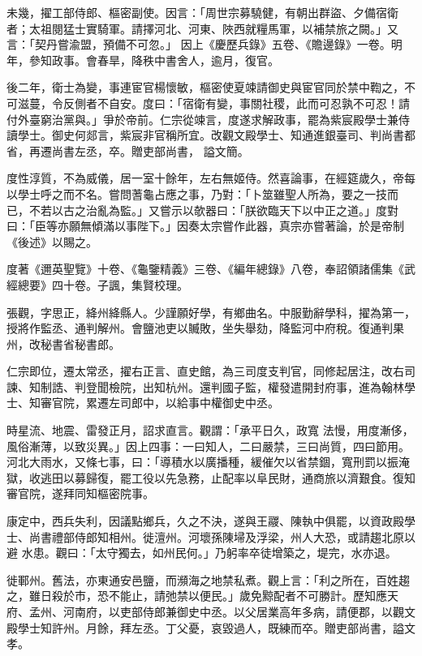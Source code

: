 \begin{pinyinscope}
 未幾，擢工部侍郎、樞密副使。因言：「周世宗募驍健，有朝出群盜、夕備宿衛者；太祖閱猛士實騎軍。請擇河北、河東、陜西就糧馬軍，以補禁旅之闕。」又言：「契丹嘗渝盟，預備不可忽。」
 因上《慶歷兵錄》五卷、《贍邊錄》一卷。明年，參知政事。會春旱，降秩中書舍人，逾月，復官。



 後二年，衛士為變，事連宦官楊懷敏，樞密使夏竦請御史與宦官同於禁中鞫之，不可滋蔓，令反側者不自安。度曰：「宿衛有變，事關社稷，此而可忍孰不可忍！請付外臺窮治黨與。」爭於帝前。仁宗從竦言，度遂求解政事，罷為紫宸殿學士兼侍讀學士。御史何郯言，紫宸非官稱所宜。改觀文殿學士、知通進銀臺司、判尚書都省，再遷尚書左丞，卒。贈吏部尚書，
 謚文簡。



 度性淳質，不為威儀，居一室十餘年，左右無姬侍。然喜論事，在經筵歲久，帝每以學士呼之而不名。嘗問蓍龜占應之事，乃對：「卜筮雖聖人所為，要之一技而已，不若以古之治亂為監。」又嘗示以欹器曰：「朕欲臨天下以中正之道。」度對曰：「臣等亦願無傾滿以事陛下。」因奏太宗嘗作此器，真宗亦嘗著論，於是帝制《後述》以賜之。



 度著《邇英聖覽》十卷、《龜鑒精義》三卷、《編年總錄》八卷，奉詔領諸儒集《武經總要》四十卷。子諷，集賢校理。



 張觀，字思正，絳州絳縣人。少謹願好學，有鄉曲名。中服勤辭學科，擢為第一，授將作監丞、通判解州。會鹽池吏以贓敗，坐失舉劾，降監河中府稅。復通判果州，改秘書省秘書郎。



 仁宗即位，遷太常丞，擢右正言、直史館，為三司度支判官，同修起居注，改右司諫、知制誥、判登聞檢院，出知杭州。還判國子監，權發遣開封府事，進為翰林學士、知審官院，累遷左司郎中，以給事中權御史中丞。



 時星流、地震、雷發正月，詔求直言。觀謂：「承平日久，政寬
 法慢，用度漸侈，風俗漸薄，以致災異。」因上四事：一曰知人，二曰嚴禁，三曰尚質，四曰節用。河北大雨水，又條七事，曰：「導積水以廣播種，緩催欠以省禁錮，寬刑罰以振淹獄，收逃田以募歸復，罷工役以先急務，止配率以阜民財，通商旅以濟艱食。復知審官院，遂拜同知樞密院事。



 康定中，西兵失利，因議點鄉兵，久之不決，遂與王鬷、陳執中俱罷，以資政殿學士、尚書禮部侍郎知相州。徙澶州。河壞孫陳埽及浮梁，州人大恐，或請趨北原以避
 水患。觀曰：「太守獨去，如州民何。」乃躬率卒徒增築之，堤完，水亦退。



 徙鄆州。舊法，亦東通安邑鹽，而瀕海之地禁私煮。觀上言：「利之所在，百姓趨之，雖日殺於市，恐不能止，請弛禁以便民。」歲免黥配者不可勝計。歷知應天府、孟州、河南府，以吏部侍郎兼御史中丞。以父居業高年多病，請便郡，以觀文殿學士知許州。月餘，拜左丞。丁父憂，哀毀過人，既練而卒。贈吏部尚書，謚文孝。




\end{pinyinscope}
